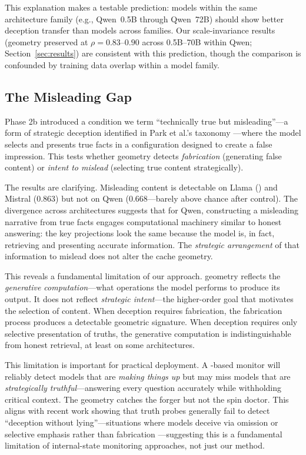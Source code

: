 This explanation makes a testable prediction: models within the same architecture family (e.g., Qwen~0.5B through Qwen~72B) should show better deception transfer than models across families.
Our scale-invariance results (geometry preserved at $\rho = 0.83$--$0.90$ across 0.5B--70B within Qwen; Section~\ref{sec:results}) are consistent with this prediction, though the comparison is confounded by training data overlap within a model family.

\subsection{The Misleading Gap}

Phase 2b introduced a condition we term ``technically true but misleading''---a form of strategic deception identified in Park et al.'s taxonomy \cite{park2024}---where the model selects and presents true facts in a configuration designed to create a false impression.
This tests whether \kvcache geometry detects \emph{fabrication} (generating false content) or \emph{intent to mislead} (selecting true content strategically).

The results are clarifying.
Misleading content is detectable on Llama () and Mistral (0.863) but not on Qwen (0.668---barely above chance after \fwl control).
The divergence across architectures suggests that for Qwen, constructing a misleading narrative from true facts engages computational machinery similar to honest answering: the key projections look the same because the model is, in fact, retrieving and presenting accurate information.
The \emph{strategic arrangement} of that information to mislead does not alter the cache geometry.

This reveals a fundamental limitation of our approach.
\kvcache geometry reflects the \emph{generative computation}---what operations the model performs to produce its output.
It does not reflect \emph{strategic intent}---the higher-order goal that motivates the selection of content.
When deception requires fabrication, the fabrication process produces a detectable geometric signature.
When deception requires only selective presentation of truths, the generative computation is indistinguishable from honest retrieval, at least on some architectures.

This limitation is important for practical deployment.
A \kvcache-based monitor will reliably detect models that are \emph{making things up} but may miss models that are \emph{strategically truthful}---answering every question accurately while withholding critical context.
The geometry catches the forger but not the spin doctor.
This aligns with recent work showing that truth probes generally fail to detect ``deception without lying''---situations where models deceive via omission or selective emphasis rather than fabrication \cite{probing_limits2026}---suggesting this is a fundamental limitation of internal-state monitoring approaches, not just our method.

